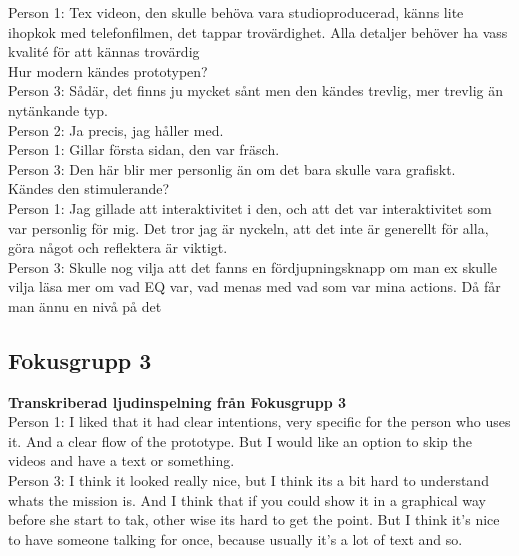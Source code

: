 Person 1: Tex videon, den skulle behöva vara studioproducerad, känns lite ihopkok med telefonfilmen, det tappar trovärdighet. Alla detaljer behöver ha vass kvalité för att kännas trovärdig \\

Hur modern kändes prototypen? \\

Person 3: Sådär, det finns ju mycket sånt men den kändes trevlig, mer trevlig än nytänkande typ. \\ 

Person 2: Ja precis, jag håller med.\\

Person 1: Gillar första sidan, den var fräsch. \\

Person 3: Den här blir mer personlig än om det bara skulle vara grafiskt. \\

Kändes den stimulerande? \\

Person 1:  Jag gillade att  interaktivitet i den, och att det var interaktivitet som var personlig för mig. Det tror jag är nyckeln, att det inte är generellt för alla, göra något och reflektera är viktigt. \\

Person 3: Skulle nog vilja att det fanns en fördjupningsknapp om man ex skulle vilja läsa mer om vad EQ var, vad menas med vad som var mina actions. Då får man ännu en nivå på det \\

\subsection{Fokusgrupp 3}

\textbf{Transkriberad ljudinspelning från Fokusgrupp 3} \\

Person 1: I liked that it had clear intentions, very specific for the person who uses it. And a clear flow of the prototype. But I would like an option to skip the videos and have a text or something. \\

Person 3: I think it looked really nice, but I think its a bit hard to understand whats the mission is. And I think that if you could show it in a graphical way before she start to tak, other wise its hard to get the point.  But I think it’s nice to have someone talking for once, because usually it’s a lot of text and so.\\

